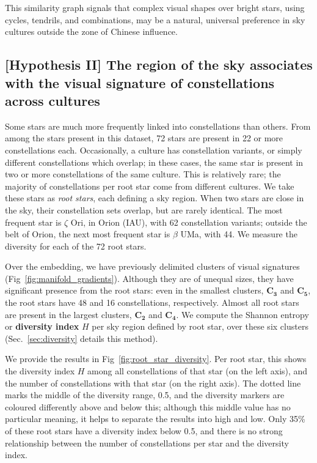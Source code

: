 \documentclass[10pt]{article}
\begin{document}
This similarity graph signals that complex visual shapes over bright stars, using cycles, tendrils, and combinations, may be a natural, universal preference in sky cultures outside the zone of Chinese influence.

\subsection{[Hypothesis II] The region of the sky associates with the visual signature of constellations across cultures} %

Some stars are much more frequently linked into constellations than others. From among the stars present in this dataset, 72 stars are present in 22 or more constellations each. Occasionally, a culture has constellation variants, or simply different constellations which overlap; in these cases, the same star is present in two or more constellations of the same culture. This is relatively rare; the majority of constellations per root star come from different cultures. We take these stars as \emph{root stars}, each defining a sky region. When two stars are close in the sky, their constellation sets overlap, but are rarely identical. The most frequent star is $\zeta$ Ori, in Orion (IAU), with 62 constellation variants; outside the belt of Orion, the next most frequent star is $\beta$ UMa, with 44. We measure the diversity for each of the 72 root stars.

Over the embedding, we have previously delimited clusters of visual signatures (Fig~\ref{fig:manifold_gradients}). Although they are of unequal sizes, they have significant presence from the root stars: even in the smallest clusters, $\mathbf{C_3}$ and $\mathbf{C_5}$, the root stars have 48 and 16 constellations, respectively. Almost all root stars are present in the largest clusters, $\mathbf{C_2}$ and $\mathbf{C_4}$. We compute the Shannon entropy or {\bf diversity index} $H$ per sky region defined by root star, over these six clusters (Sec.~\ref{sec:diversity} details this method).

We provide the results in Fig~\ref{fig:root_star_diversity}. Per root star, this shows the diversity index $H$ among all constellations of that star (on the left axis), and the number of constellations with that star (on the right axis). The dotted line marks the middle of the diversity range, 0.5, and the diversity markers are coloured differently above and below this; although this middle value has no particular meaning, it helps to separate the results into high and low. Only 35\% of these root stars have a diversity index below 0.5, and there is no strong relationship between the number of constellations per star and the diversity index. 
\end{document}
